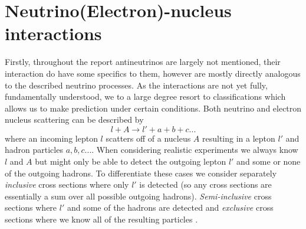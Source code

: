 \documentclass[a4paper,12pt]{article}
\newcommand{\efn}{e4$\nu$}
\begin{document}



\section{Neutrino(Electron)-nucleus interactions}\label{sec:nenuc_inter}
Firstly, throughout the report antineutrinos are largely not mentioned, their interaction do have some specifics to them, however are mostly directly analogous to the described neutrino processes.
As the interactions are not yet fully, fundamentally understood, we to a large degree resort to classifications which allows us to make prediction under certain conditions.
Both neutrino and electron nucleus scattering can be described by
\begin{equation}\label{eq:genint}
    l + A \rightarrow l' + a + b + c ...
\end{equation}
where an incoming lepton $l$ scatters off of a nucleus $A$ resulting in a lepton $l'$ and hadron particles $a, b, c ...$.
When considering realistic experiments we always know $l$ and $A$ but might only be able to detect the outgoing lepton $l'$ and some or none of the outgoing hadrons. 
To differentiate these cases we consider separately \emph{inclusive} cross sections where only $l'$ is detected (so any cross sections are essentially a sum over all possible outgoing hadrons).
\emph{Semi-inclusive} cross sections where $l'$ and some of the hadrons are detected and \emph{exclusive} cross sections where we know all of the resulting particles \cite{amaroElectronNeutrinonucleusScattering2020}.
\end{document}
